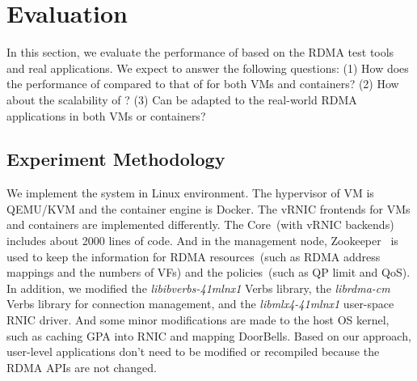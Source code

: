\section{Evaluation} \label{eval}
In this section, we evaluate the performance of \sys based on the RDMA test tools and real applications. We expect to answer the following questions: (1) How does the performance of \sys compared to that of \native for both VMs and containers? (2) How about the scalability of \sys? (3) Can \sys be adapted to the real-world RDMA applications in both VMs or containers?
%
%

\subsection{Experiment Methodology}


We implement the \sys system in Linux environment. The hypervisor of VM is QEMU/KVM and the container engine is Docker. The vRNIC frontends for VMs and containers are implemented differently. The \sys Core~(with vRNIC backends) includes about 2000 lines of code.
And in the management node, Zookeeper~\cite{zookeeper} is used to keep the information for RDMA resources~(such as RDMA address mappings and the numbers of VFs) and the policies~(such as QP limit and QoS).
In addition, we modified the \textit{libibverbs-41mlnx1} Verbs library, the \textit{librdma-cm} Verbs library for connection management, and the \textit{libmlx4-41mlnx1} user-space RNIC driver.
And some minor modifications are made to the host OS kernel, such as caching GPA into RNIC and mapping DoorBells.
Based on our approach, user-level applications don't need to be modified or recompiled because the RDMA APIs are not changed. %

